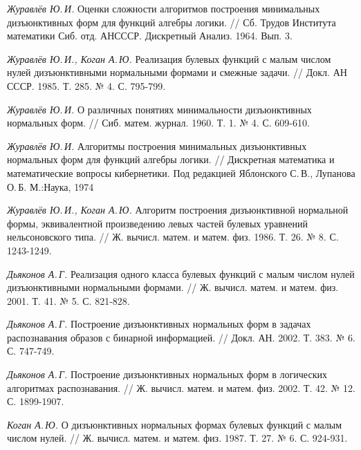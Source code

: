 \documentclass[12pt,a4paper,oneside,fleqn,leqno]{article}
\theoremstyle{definition}
\begin{document}
\renewcommand{\bibname}{Список литературы}
\addcontentsline{toc}{section}{\bibname}


\def\BibUrl#1.{}\def\BibAnnote#1.{}


\begin{thebibliography}{1}

{\it Журавлёв Ю.\,И.}
\newblock Оценки сложности алгоритмов построения минимальных дизъюнктивных форм для функций алгебры логики. // 
\newblock Сб. Трудов Института математики Сиб. отд. АНСССР. Дискретный Анализ. 1964. Вып. 3.

{\it Журавлёв Ю.\,И., Коган А.\,Ю.}
\newblock Реализация булевых функций с малым числом нулей дизъюнктивными нормальными формами и смежные задачи. //
\newblock Докл. АН СССР. 1985. Т. 285. № 4. С. 795-799.

{\it Журавлёв Ю.\,И.}
\newblock О различных понятиях минимальности дизъюнктивных нормальных форм. //
\newblock Сиб. матем. журнал. 1960. Т. 1. № 4. С. 609-610.

{\it Журавлёв Ю.\,И.}
\newblock Алгоритмы построения минимальных дизъюнктивных нормальных форм для функций алгебры логики. //
\newblock Дискретная математика и математические вопросы кибернетики. Под редакцией Яблонского С.\,В., Лупанова О.\,Б. М.:Наука, 1974

{\it Журавлёв Ю.\,И., Коган А.\,Ю.}
\newblock Алгоритм построения дизъюнктивной нормальной формы, эквивалентной произведению левых частей булевых уравнений нельсоновского типа. //
\newblock Ж. вычисл. матем. и матем. физ. 1986. Т. 26. № 8. С. 1243-1249.


{\it Дьяконов А.\,Г.}
\newblock Реализация одного класса булевых функций с малым числом нулей дизъюнктивными нормальными формами. //
\newblock Ж. вычисл. матем. и матем. физ. 2001. Т. 41. № 5. С. 821-828.


{\it Дьяконов А.\,Г.}
\newblock Построение дизъюнктивных нормальных форм в задачах распознавания образов с бинарной информацией. //
\newblock Докл. АН. 2002. Т. 383. № 6. С. 747-749.


{\it Дьяконов А.\,Г.}
\newblock Построение дизъюнктивных нормальных форм в логических алгоритмах распознавания. //
\newblock Ж. вычисл. матем. и матем. физ. 2002. Т. 42. № 12. С. 1899-1907.


{\it Коган А.\,Ю.}
\newblock О дизъюнктивных нормальных формах булевых функций с малым числом нулей. //
\newblock Ж. вычисл. матем. и матем. физ. 1987. Т. 27. № 6. С. 924-931.



\end{thebibliography}
\end{document}
